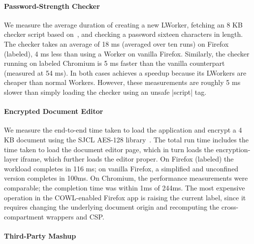 \paragraph{Password-Strength Checker}
%
%
We measure the average duration of creating a new LWorker, fetching an
8 KB checker script based on~\cite{checker1}, and checking a password
sixteen characters in length.
%
The checker takes an average of 18 ms (averaged over ten runs) on
Firefox (labeled), 4 ms less than using a Worker on vanilla Firefox.
%
Similarly, the checker running on labeled Chromium is 5 ms faster than
the vanilla counterpart (measured at 54 ms).
%
In both cases \sys{} achieves a speedup because its LWorkers are
cheaper than normal Workers.
%
However, these measurements are roughly 5 ms slower than simply loading
the checker using an unsafe \js|script| tag.

\paragraph{Encrypted Document Editor}

%
We measure the end-to-end time taken to load the application and
encrypt a 4 KB document using the SJCL AES-128 library~\cite{sjcl}.
%
The total run time includes the time taken to load the document editor
page, which in turn loads the encryption-layer iframe, which further
loads the editor proper.
%
On Firefox (labeled) the workload completes in 116 ms;  on vanilla
Firefox, a simplified and unconfined version completes in 100ms.
%
On Chromium, the performance measurements were comparable; the
completion time was within 1ms of 244ms.
%
The most expensive operation in the COWL-enabled Firefox app is
raising the current label, since it requires changing the underlying
document origin and recomputing the cross-compartment wrappers and CSP.


\paragraph{Third-Party Mashup}

